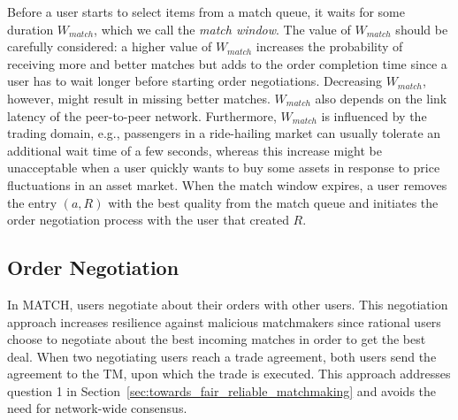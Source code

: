 Before a user starts to select items from a match queue, it waits for some duration $ W_{match} $, which we call the \emph{match window}.
The value of $ W_{match} $ should be carefully considered: a higher value of $ W_{match} $ increases the probability of receiving more and better matches but adds to the order completion time since a user has to wait longer before starting order negotiations.
Decreasing $ W_{match} $, however, might result in missing better matches.
$ W_{match} $ also depends on the link latency of the peer-to-peer network.
Furthermore, $ W_{match} $ is influenced by the trading domain, e.g., passengers in a ride-hailing market can usually tolerate an additional wait time of a few seconds, whereas this increase might be unacceptable when a user quickly wants to buy some assets in response to price fluctuations in an asset market.
When the match window expires, a user removes the entry $ (a, R) $ with the best quality from the match queue and initiates the order negotiation process with the user that created $ R $.

\subsection{Order Negotiation}
\label{sec:order_negotiation}

In MATCH, users negotiate about their orders with other users.
This negotiation approach increases resilience against malicious matchmakers since rational users choose to negotiate about the best incoming matches in order to get the best deal.
When two negotiating users reach a trade agreement, both users send the agreement to the TM, upon which the trade is executed.
This approach addresses question 1 in Section~\ref{sec:towards_fair_reliable_matchmaking} and avoids the need for network-wide consensus.

